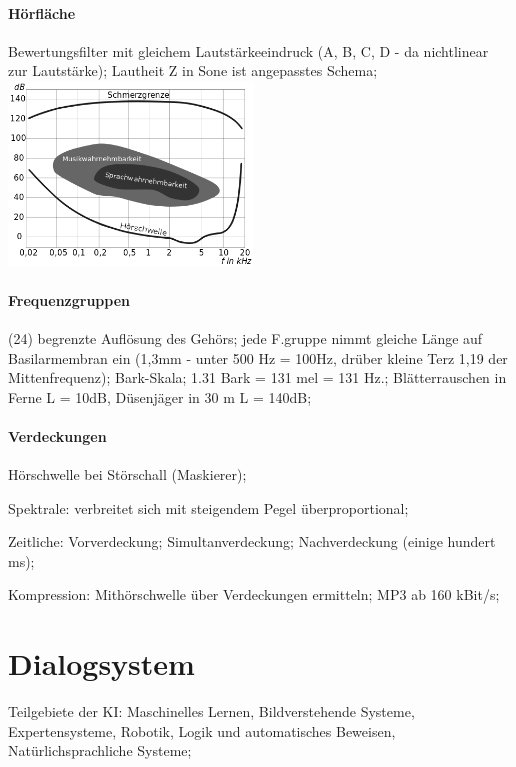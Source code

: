 \documentclass[6pt,a4paper]{scrartcl}
\begin{document}
\begin{multicols*}{4}
{\paragraph{Hörfläche} Bewertungsfilter mit gleichem Lautstärkeeindruck (A, B, C, D - da nichtlinear zur Lautstärke); Lautheit Z in Sone ist angepasstes Schema; 
\includegraphics[width=6.5cm]{./img/Hoerflaeche.png}

\paragraph{Frequenzgruppen} (24) begrenzte Auflösung des Gehörs; jede F.gruppe nimmt gleiche Länge auf Basilarmembran ein (1,3mm - unter 500 Hz = 100Hz, drüber kleine Terz 1,19 der Mittenfrequenz); Bark-Skala; 1.31 Bark = 131 mel = 131 Hz.; Blätterrauschen in Ferne L = 10dB, Düsenjäger in 30 m L = 140dB; 

\paragraph{Verdeckungen} Hörschwelle bei Störschall (Maskierer); 

Spektrale: verbreitet sich mit steigendem Pegel überproportional; 

Zeitliche: Vorverdeckung; Simultanverdeckung; Nachverdeckung (einige hundert ms); 

Kompression: Mithörschwelle über Verdeckungen ermitteln; MP3 ab 160 kBit/s; 
}

\section{Dialogsystem}
Teilgebiete der KI: Maschinelles Lernen, Bildverstehende Systeme, Expertensysteme, Robotik, Logik und automatisches Beweisen, Natürlichsprachliche Systeme; 


\end{multicols*}
\end{document}

